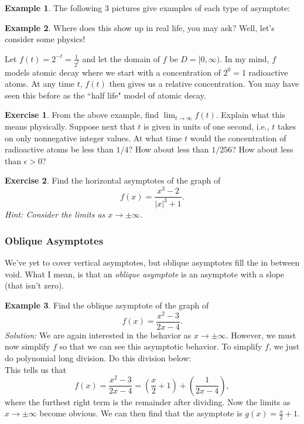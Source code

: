 \documentclass[leqno]{article}
\theoremstyle{definition}
\newtheorem{example}{Example}[section]
\newtheorem{exercise}{Exercise}[section]
\theoremstyle{remark}
\theoremstyle{theorem}
\begin{document}
\begin{example}
The following 3 pictures give examples of each type of asymptote:
\vspace*{6cm}
\end{example}

\begin{example}
Where does this show up in real life, you may ask?  Well, let's consider some physics!  

Let $f(t)=2^{-t}=\frac{1}{2^t}$ and let the domain of $f$ be $D=[0,\infty)$. In my mind, $f$ models atomic decay where we start with a concentration of $2^0=1$ radioactive atoms. At any time $t$, $f(t)$ then gives us a relative concentration.  You may have seen this before as the ``half life" model of atomic decay.
\end{example}

\begin{exercise}
From the above example, find $\lim_{t\to \infty} f(t)$.  Explain what this means physically. Suppose next that $t$ is given in units of one second, i.e., $t$ takes on only nonnegative integer values.  At what time $t$ would the concentration of radioactive atoms be less than $1/4$? How about less than $1/256$?  How about less than $\epsilon>0$?
\vspace*{6cm}
\end{exercise}

\begin{exercise}
Find the horizontal asymptotes of the graph of
\[
f(x)=\frac{x^3-2}{|x|^3+1}.
\]
\emph{Hint: Consider the limits as $x\to \pm \infty$.}
\vspace*{5cm}
\end{exercise}

\subsubsection{Oblique Asymptotes}

We've yet to cover vertical asymptotes, but oblique asymptotes fill the in between void.  What I mean, is that an \emph{oblique asymptote} is an asymptote with a slope (that isn't zero).

\begin{example}
\label{example: oblique}
Find the oblique asymptote of the graph of
\[
f(x)=\frac{x^2-3}{2x-4}.
\]
\emph{Solution:} We are again interested in the behavior as $x\to \pm \infty$.  However, we must now simplify $f$ so that we can see this asymptotic behavior. To simplify $f$, we just do polynomial long division.  Do this division below:
\vspace*{5cm}\\
This tells us that
\[
f(x)=\frac{x^2-3}{2x-4}=\left(\frac{x}{2}+1\right) + \left( \frac{1}{2x-4} \right),
\]
where the furthest right term is the remainder after dividing.  Now the limits as $x\to \pm \infty$ become obvious. We can then find that the asymptote is $g(x)=\frac{x}{2}+1$.
\end{example}
\end{document}
